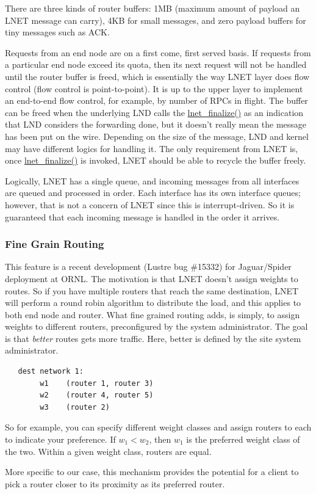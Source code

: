 There are three kinds of router buffers: 1MB (maximum amount of payload an LNET
message can carry), 4KB for small messages, and zero payload buffers for tiny
messages such as ACK. 

Requests from an end node are on a first come, first served basis. If requests from
a particular end node exceed its quota, then its next request will not be
handled until the router buffer is freed, which is essentially the way LNET
layer does flow control (flow control is point-to-point). It is up to the upper
layer to implement an end-to-end flow control, for example, by number of RPCs
in flight. The buffer can be freed when the underlying LND calls the
\url{lnet_finalize()} as an indication that LND considers the forwarding done,
but it doesn't really mean the message has been put on the wire. Depending on
the size of the message, LND and kernel may have different logics for handling
it. The only requirement from LNET is, once \url{lnet_finalize()} is invoked,
LNET should be able to recycle the buffer freely. 

Logically, LNET has a single queue, and incoming messages from all interfaces
are queued and processed in order. Each interface has its own interface
queues; however, that is not a concern of LNET since this is interrupt-driven.
So it is guaranteed that each incoming message is handled in the order it
arrives.  


\subsubsection{Fine Grain Routing}

This feature is a recent development (Lustre bug \#15332) for Jaguar/Spider
deployment at ORNL. The motivation is that LNET doesn't assign weights to
routes. So if you have multiple routers that reach the same destination,
LNET will perform a round robin algorithm to distribute the load, and this
applies to both end node and router. What fine grained routing adds, is simply,
to assign weights to different routers, preconfigured by the system
administrator.  The goal is that \textit{better} routes gets more traffic.
Here, better is defined by the site system administrator.

\begin{Verbatim}
   dest network 1:
        w1    (router 1, router 3)
        w2    (router 4, router 5)
        w3    (router 2)
\end{Verbatim}

So for example, you can specify different weight classes and assign routers to
each to indicate your preference. If $w_1 < w_2$, then $w_1$ is the preferred
weight class of the two. Within a given weight class, routers are equal.

More specific to our case, this mechanism provides the potential for a client
to pick a router closer to its proximity as its preferred router.
